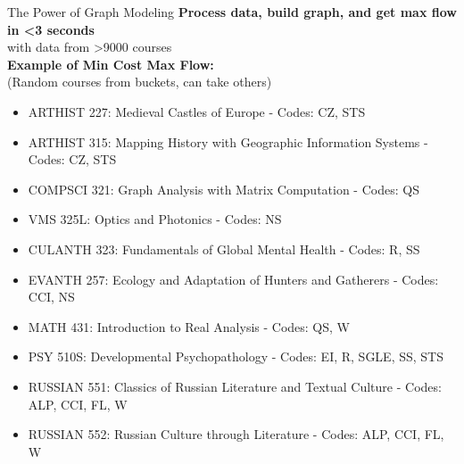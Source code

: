 \documentclass{beamer}
\begin{document}
\begin{frame}{The Power of Graph Modeling}
    \centering
    \textbf{Process data, build graph, and get max flow in  \textless 3 seconds}\\
    \large with data from \textgreater 9000 courses\\
    \vspace{0.2cm}
    \textbf{Example of Min Cost Max Flow:} \\
    \small (Random courses from buckets, can take others)
    \begin{itemize}
        \footnotesize
        \item  ARTHIST 227: Medieval Castles of Europe - Codes: CZ, STS
        \item ARTHIST 315: Mapping History with Geographic Information Systems - Codes: CZ, STS
        \item COMPSCI 321: 	Graph Analysis with Matrix Computation - Codes: QS
        \item VMS 325L: Optics and Photonics - Codes: NS
        \item CULANTH 323: Fundamentals of Global Mental Health - Codes: R, SS
        \item EVANTH 257: Ecology and Adaptation of Hunters and Gatherers - Codes: CCI, NS
        \item MATH 431: Introduction to Real Analysis - Codes: QS, W
        \item PSY 510S: Developmental Psychopathology - Codes: EI, R, SGLE, SS, STS
        \item RUSSIAN 551: Classics of Russian Literature and Textual Culture - Codes: ALP, CCI, FL, W
        \item RUSSIAN 552: Russian Culture through Literature - Codes: ALP, CCI, FL, W
    \end{itemize}
    
\end{frame}
\end{document}
